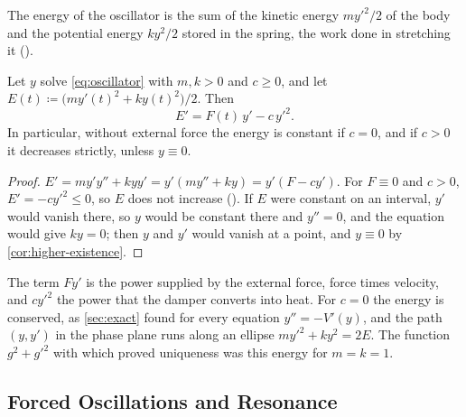 The energy of the oscillator is the sum of the kinetic energy $my'^2/2$ of the body and the potential energy $ky^2/2$ stored in the spring, the work done in stretching it ().

\begin{proposition}
\label{prop:oscillator-energy}
Let $y$ solve \eqref{eq:oscillator} with $m,k>0$ and $c\ge0$, and let $E(t)\coloneqq\bigl(my'(t)^2+ky(t)^2\bigr)/2$. Then
\[
E'=F(t)\,y'-c\,y'^2 .
\]
In particular, without external force the energy is constant if $c=0$, and if $c>0$ it decreases strictly, unless $y\equiv0$.
\end{proposition}

\begin{proof}
$E'=my'y''+kyy'=y'(my''+ky)=y'(F-cy')$. For $F\equiv0$ and $c>0$, $E'=-cy'^2\le0$, so $E$ does not increase (). If $E$ were constant on an interval, $y'$ would vanish there, so $y$ would be constant there and $y''=0$, and the equation would give $ky=0$; then $y$ and $y'$ would vanish at a point, and $y\equiv0$ by \cref{cor:higher-existence}.
\end{proof}

The term $Fy'$ is the power supplied by the external force, force times velocity, and $cy'^2$ the power that the damper converts into heat. For $c=0$ the energy is conserved, as \cref{sec:exact} found for every equation $y''=-V'(y)$, and the path $(y,y')$ in the phase plane runs along an ellipse $my'^2+ky^2=2E$. The function $g^2+g'^2$ with which  proved uniqueness was this energy for $m=k=1$.

\subsection{Forced Oscillations and Resonance}

